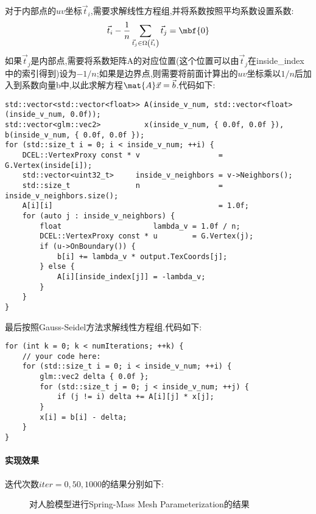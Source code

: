 \documentclass{ctexart}
\begin{document}
对于内部点的$uv$坐标$\vec{t}_i$,需要求解线性方程组,并将系数按照平均系数设置系数:
\[\vec{t}_i-\dfrac{1}{n}\sum_{\vec{t}_j\in\Omega\left(\vec{t}_i\right)}\vec{t}_j=\mbf{0}\]
如果$\vec{t}_j$是内部点,需要将系数矩阵{\codefont A}的对应位置(这个位置可以由$\vec{t}_j$在{\codefont inside\_index}中的索引得到)设为$-1/n$;如果是边界点,则需要将前面计算出的$uv$坐标乘以$1/n$后加入到系数向量{\codefont b}中,以此求解方程$\mat{A}\vec{x}=\vec{b}$.代码如下:
\begin{lstlisting}
std::vector<std::vector<float>> A(inside_v_num, std::vector<float>(inside_v_num, 0.0f));
std::vector<glm::vec2>          x(inside_v_num, { 0.0f, 0.0f }), b(inside_v_num, { 0.0f, 0.0f });
for (std::size_t i = 0; i < inside_v_num; ++i) {
    DCEL::VertexProxy const * v                  = G.Vertex(inside[i]);
    std::vector<uint32_t>     inside_v_neighbors = v->Neighbors();
    std::size_t               n                  = inside_v_neighbors.size();
    A[i][i]                                      = 1.0f;
    for (auto j : inside_v_neighbors) {
        float                     lambda_v = 1.0f / n;
        DCEL::VertexProxy const * u        = G.Vertex(j);
        if (u->OnBoundary()) {
            b[i] += lambda_v * output.TexCoords[j];
        } else {
            A[i][inside_index[j]] = -lambda_v;
        }
    }
}
\end{lstlisting}
最后按照Gauss-Seidel方法求解线性方程组.代码如下:
\begin{lstlisting}
for (int k = 0; k < numIterations; ++k) {
    // your code here:
    for (std::size_t i = 0; i < inside_v_num; ++i) {
        glm::vec2 delta { 0.0f };
        for (std::size_t j = 0; j < inside_v_num; ++j) {
            if (j != i) delta += A[i][j] * x[j];
        }
        x[i] = b[i] - delta;
    }
}
\end{lstlisting}
\paragraph{实现效果}
迭代次数$iter=0,50,1000$的结果分别如下:
\begin{figure}[H]
    \centering
    \qquad\qquad
    \qquad\qquad
    \caption{对人脸模型进行Spring-Mass Mesh Parameterization的结果}
\end{figure}
\end{document}
